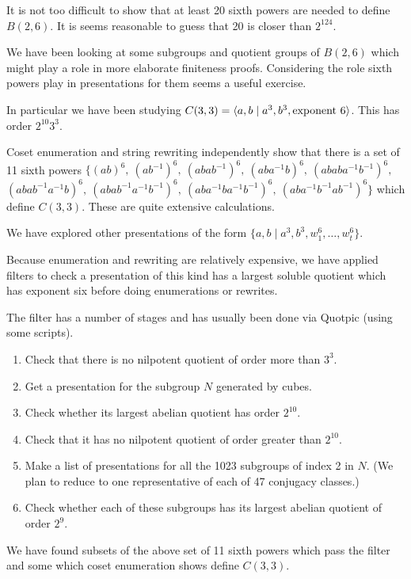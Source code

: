 \documentclass[12pt]{article}
\begin{document}
It is not too difficult to show that at least 20 sixth powers are needed
to define $B(2,6)$.
It is seems reasonable to guess that 20 is closer than $2^{124}$.

We have been looking at some subgroups and quotient groups of $B(2,6)$ 
which might play a role in more elaborate finiteness proofs. Considering
the role sixth powers play in presentations for them seems a useful
exercise.

In particular we have been studying
$C(3,3) = \langle a,b \mid a^3,b^3, {\rm exponent\ } 6 \rangle$.
This has order $2^{10} 3^3$.

Coset enumeration and string rewriting independently show that there is a
set of 11 sixth powers 
$\{
(ab)^6,\  
(ab^{-1})^6,\  
(abab^{-1})^6,\  
(aba^{-1}b)^6,\  
(ababa^{-1}b^{-1})^6,\  
$
$ 
(abab^{-1}a^{-1}b)^6,\ 
(abab^{-1}a^{-1}b^{-1})^6,\  
(aba^{-1}ba^{-1}b^{-1})^6,\  
(aba^{-1}b^{-1}ab^{-1})^6
\}$
which define $C(3,3)$. 
These are quite extensive calculations.

We have explored other presentations of the form
$\{a,b \mid a^3,b^3, w_1^6,\dots \! ,w_t^6\}.$

Because enumeration and rewriting are relatively expensive, we have
applied filters to check  a presentation of this kind has a
largest soluble  quotient which has exponent six before doing 
enumerations or rewrites.

The filter has a number of stages and has usually been done via
Quotpic (using some scripts).
\begin{enumerate}
\item
Check that there is no nilpotent quotient of order more than $3^3$.
\item
Get a presentation for the subgroup $N$ generated by cubes.
\item
Check whether its largest abelian quotient has order $2^{10}$.
\item
Check that it has no nilpotent quotient of order greater than $2^{10}$.
\item
Make a list of presentations for all the 1023 subgroups of index 2 in $N$.
(We plan to reduce to one representative of each of 47 conjugacy classes.)
\item
Check whether each of these subgroups has its largest abelian quotient of
order $2^9$.
\end{enumerate}

We have found subsets of the above set of 11 sixth powers which pass the
filter and some which coset enumeration shows define $C(3,3)$.
\end{document}
